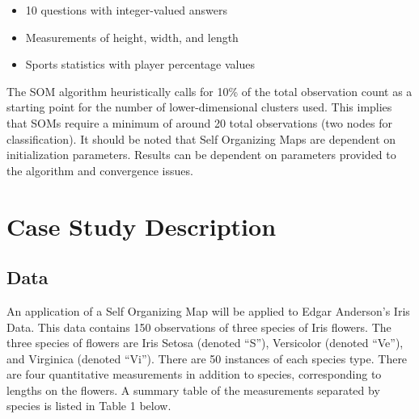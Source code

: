 \documentclass[12pt,]{article}
\providecommand{\tightlist}{%
  \setlength{\itemsep}{0pt}\setlength{\parskip}{0pt}}
\begin{document}
\begin{itemize}
\tightlist
\item
  10 questions with integer-valued answers
\item
  Measurements of height, width, and length
\item
  Sports statistics with player percentage values
\end{itemize}

The SOM algorithm heuristically calls for 10\% of the total observation
count as a starting point for the number of lower-dimensional clusters
used. This implies that SOMs require a minimum of around 20 total
observations (two nodes for classification). It should be noted that
Self Organizing Maps are dependent on initialization parameters. Results
can be dependent on parameters provided to the algorithm and convergence
issues.

\hypertarget{case-study-description}{%
\section{Case Study Description}\label{case-study-description}}

\hypertarget{data}{%
\subsection{Data}\label{data}}

An application of a Self Organizing Map will be applied to Edgar
Anderson's Iris Data. This data contains 150 observations of three
species of Iris flowers. The three species of flowers are Iris Setosa
(denoted ``S''), Versicolor (denoted ``Ve''), and Virginica (denoted
``Vi''). There are 50 instances of each species type. There are four
quantitative measurements in addition to species, corresponding to
lengths on the flowers. A summary table of the measurements separated by
species is listed in Table 1 below.
\end{document}
